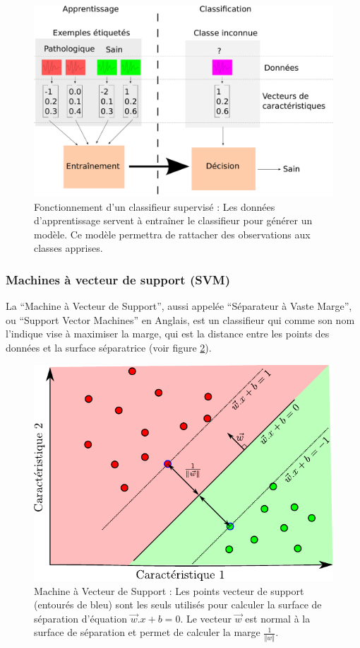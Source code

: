 \begin{figure}[h]
	\label{fig:fonctClassif}
	\begin{center}
	\includegraphics[width=15cm]{images/fonctionnementClassif}
	\end{center}
	\caption{Fonctionnement d'un classifieur supervisé : Les données d'apprentissage servent à entraîner le classifieur pour générer un modèle. Ce modèle permettra de rattacher des observations aux classes apprises.}
\end{figure}

		\subsubsection{Machines à vecteur de support (SVM)}
\label{lab:SVM}
La ``Machine à Vecteur de Support'', aussi appelée ``Séparateur à Vaste Marge'', ou ``Support Vector Machines'' en Anglais, est un classifieur qui comme son nom l'indique vise à maximiser la marge\cite{boser1992training}, qui est la distance entre les points des données et la surface séparatrice (voir figure \ref{fig:SVM}).

\begin{figure}[h]
	\label{fig:SVM}
	\begin{center}
	\includegraphics[width=12cm]{images/SVM}
	\end{center}
	\caption{Machine à Vecteur de Support : Les points vecteur de support (entourés de bleu) sont les seuls utilisés pour calculer la surface de séparation d'équation $\vec w . x + b = 0$. Le vecteur $\vec w$ est normal à la surface de séparation et permet de calculer la marge $\frac{1}{\Vert w \Vert}$.}
\end{figure}

